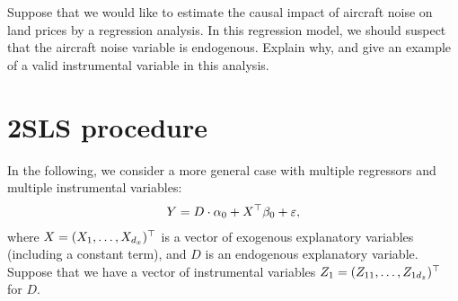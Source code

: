 \documentclass[11pt, A4paper, openany, uplatex]{book}
\begin{document}
\hrulefill
\begin{exercise}\upshape
	Suppose that we would like to estimate the causal impact of aircraft noise on land prices by a regression analysis.
	In this regression model, we should suspect that the aircraft noise variable is endogenous. Explain why, and give an example of a valid instrumental variable in this analysis.
\end{exercise}

\section{2SLS procedure}

In the following, we consider a more general case with multiple regressors and multiple instrumental variables:
\begin{align*}
	Y = D \cdot \alpha_0 + X^\top \beta_0 + \varepsilon,
\end{align*}
where $X = (X_1, \ldots , X_{d_x})^\top$ is a vector of exogenous explanatory variables (including a constant term), and $D$ is an endogenous explanatory variable.
Suppose that we have a vector of instrumental variables $Z_1 = (Z_{11}, \ldots, Z_{1d_z})^\top$ for $D$.
\end{document}
